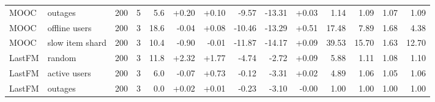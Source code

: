 \begin{table}[!htb]
{\begin{tabular}{@{}lllrrrrrrrrrrr@{}}
MOOC & outages & 200 & 5 & 5.6 & +0.20 & +0.10 & -9.57 & -13.31 & +0.03 & 1.14 & 1.09 & 1.07 & 1.09 \\
MOOC & offline users & 200 & 3 & 18.6 & -0.04 & +0.08 & -10.46 & -13.29 & +0.51 & 17.48 & 7.89 & 1.68 & 4.38 \\
MOOC & slow item shard & 200 & 3 & 10.4 & -0.90 & -0.01 & -11.87 & -14.17 & +0.09 & 39.53 & 15.70 & 1.63 & 12.70 \\
LastFM & random & 200 & 3 & 11.8 & +2.32 & +1.77 & -4.74 & -2.72 & +0.09 & 5.88 & 1.11 & 1.08 & 1.10 \\
LastFM & active users & 200 & 3 & 6.0 & -0.07 & +0.73 & -0.12 & -3.31 & +0.02 & 4.89 & 1.06 & 1.05 & 1.06 \\
LastFM & outages & 200 & 3 & 0.0 & +0.02 & +0.01 & -0.23 & -3.10 & -0.00 & 1.00 & 1.00 & 1.00 & 1.00 \\
\bottomrule
\end{tabular}}
\end{table}
